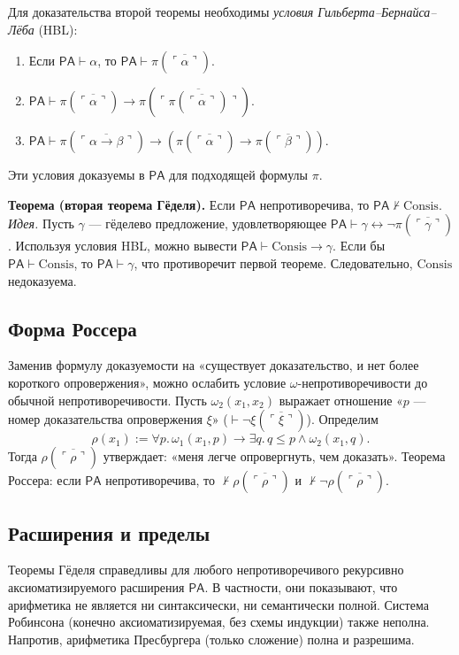 \documentclass[10pt]{article}
\begin{document}
Для доказательства второй теоремы необходимы \emph{условия Гильберта–Бернайса–Лёба} (HBL):
\begin{enumerate}
  \item Если $\mathsf{PA}\vdash\alpha$, то $\mathsf{PA}\vdash\pi(\overline{\ulcorner\alpha\urcorner})$.
  \item $\mathsf{PA}\vdash\pi(\overline{\ulcorner\alpha\urcorner}) \rightarrow \pi(\overline{\ulcorner\pi(\overline{\ulcorner\alpha\urcorner})\urcorner})$.
  \item $\mathsf{PA}\vdash\pi(\overline{\ulcorner\alpha\rightarrow\beta\urcorner}) \rightarrow (\pi(\overline{\ulcorner\alpha\urcorner})\rightarrow\pi(\overline{\ulcorner\beta\urcorner}))$.
\end{enumerate}
Эти условия доказуемы в $\mathsf{PA}$ для подходящей формулы $\pi$.

\textbf{Теорема (вторая теорема Гёделя).} Если $\mathsf{PA}$ непротиворечива, то $\mathsf{PA}\not\vdash\mathrm{Consis}$.
\emph{Идея.}
Пусть $\gamma$ — гёделево предложение, удовлетворяющее $\mathsf{PA}\vdash\gamma\leftrightarrow\neg\pi(\overline{\ulcorner\gamma\urcorner})$. Используя условия HBL, можно вывести $\mathsf{PA}\vdash\mathrm{Consis}\rightarrow\gamma$. Если бы $\mathsf{PA}\vdash\mathrm{Consis}$, то $\mathsf{PA}\vdash\gamma$, что противоречит первой теореме. Следовательно, $\mathrm{Consis}$ недоказуема.

\subsection{Форма Россера}
Заменив формулу доказуемости на «существует доказательство, и нет более короткого опровержения», можно ослабить условие $\omega$-непротиворечивости до обычной непротиворечивости. Пусть $\omega_2(x_1,x_2)$ выражает отношение «$p$ — номер доказательства опровержения $\xi$» ($\vdash\neg\xi(\overline{\ulcorner\xi\urcorner})$). Определим
\[
\rho(x_1) := \forall p.\,\omega_1(x_1,p)\rightarrow\exists q.\,q\le p\land\omega_2(x_1,q).
\]
Тогда $\rho(\overline{\ulcorner\rho\urcorner})$ утверждает: «меня легче опровергнуть, чем доказать». Теорема Россера: если $\mathsf{PA}$ непротиворечива, то $\not\vdash\rho(\overline{\ulcorner\rho\urcorner})$ и $\not\vdash\neg\rho(\overline{\ulcorner\rho\urcorner})$.

\subsection{Расширения и пределы}
Теоремы Гёделя справедливы для любого непротиворечивого рекурсивно аксиоматизируемого расширения $\mathsf{PA}$. В частности, они показывают, что арифметика не является ни синтаксически, ни семантически полной. Система Робинсона (конечно аксиоматизируемая, без схемы индукции) также неполна. Напротив, арифметика Пресбургера (только сложение) полна и разрешима.
\end{document}
